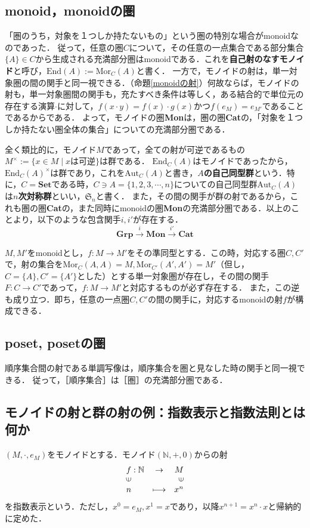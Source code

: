 \documentclass[uplatex, 12pt, dvipdfmx]{jsreport}
\begin{document}
\subsection{monoid，monoidの圏}
「圏のうち，対象を１つしか持たないもの」という圏の特別な場合がmonoidなのであった．
従って，任意の圏$C$について，その任意の一点集合である部分集合$\{ A\}\in C$から生成される充満部分圏はmonoidである．これを\textbf{自己射のなすモノイド}と呼び，$\mathrm{End}(A):=\mathrm{Mor}_C(A)$と書く．
一方で，モノイドの射は，単一対象圏の間の関手と同一視できる．（命題\ref{monoidの射}）何故ならば，モノイドの射も，単一対象圏間の関手も，充たすべき条件は等しく，ある結合的で単位元の存在する演算$\cdot$に対して，$f(x\cdot y)=f(x)\cdot g(x)$かつ$f(e_M)=e_{M'}$であることであるからである．
よって，モノイドの圏\textbf{Mon}は，圏の圏\textbf{Cat}の，「対象を１つしか持たない圏全体の集合」についての充満部分圏である．

全く類比的に，モノイド$M$であって，全ての射が可逆であるもの$M^\times :=\{ x\in M\mid xは可逆 \}$は群である．
$\mathrm{End}_C(A)$はモノイドであったから，$\mathrm{End}_C(A)^\times$は群であり，これを$\mathrm{Aut}_C(A)$と書き，\textbf{$A$の自己同型群}という．特に，$C=\mathbf{Set}$である時，$C\ni A=\{ 1,2,3,\cdots,n \}$についての自己同型群$\mathrm{Aut}_C(A)$は\textbf{$n$次対称群}といい，$\mathfrak{S}_n$と書く．
また，その間の関手が群の射であるから，これも圏の圏\textbf{Cat}の，また同時にmonoidの圏\textbf{Mon}の充満部分圏である．以上のことより，以下のような包含関手$i,i'$が存在する．
$$\mathbf{Grp}\xrightarrow{i}\mathbf{Mon}\xrightarrow{i'}\mathbf{Cat}$$

\begin{proposition}[monoidの射]\label{monoidの射}
    $M,M'$をmonoidとし，$f:M\to M'$をその準同型とする．この時，対応する圏$C,C'$で，射の集合を$\mathrm{Mor}_C(A,A)=M, \mathrm{Mor}_{C'}(A',A')=M'$（但し，$C=\{ A\},C'=\{ A'\}$とした）とする単一対象圏が存在し，その間の関手$F:C\to C'$であって，$f:M\to M'$と対応するものが必ず存在する．
    また，この逆も成り立つ．即ち，任意の一点圏$C,C'$の間の関手に，対応するmonoidの射$f$が構成できる．
\end{proposition}

\subsection{poset, posetの圏}
順序集合間の射である単調写像は，順序集合を圏と見なした時の関手と同一視できる．
従って，［順序集合］は［圏］の充満部分圏である．

\subsection{モノイドの射と群の射の例：指数表示と指数法則とは何か}
$(M,\cdot, e_M)$をモノイドとする．モノイド$(\mathbb{N},+,0)$からの射
$$\begin{array}{lcr}f:\mathbb{N}&\rightarrow &M\\ \rotatebox{90}{$\in$} & & \rotatebox{90}{$\in$} \\ n & \longmapsto & x^n \end{array}$$
を指数表示という．ただし，$x^0 = e_M, x^1 = x$であり，以降$x^{n+1}=x^n\cdot x$と帰納的に定めた．
\end{document}
